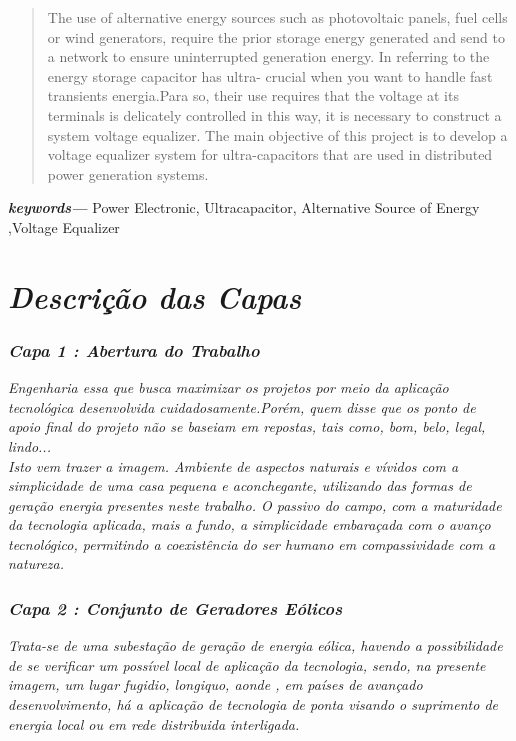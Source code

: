 \documentclass[11pt, a4paper, oneside]{article}
\providecommand{\keywords}[1]{\textbf{\textit{keywords---}} #1}
\begin{document}
\begin{abstract}
The use of alternative energy sources such as photovoltaic panels,
fuel cells or wind generators, require the prior storage
energy generated and send to a network to ensure uninterrupted generation
energy. In referring to the energy storage capacitor has ultra-
crucial when you want to handle fast transients
energia.Para so, their use requires that the voltage at its terminals is
delicately controlled in this way, it is necessary to construct a system
voltage equalizer. The main objective of this project is to develop
a voltage equalizer system for ultra-capacitors that are used in
distributed power generation systems.
\end{abstract}

\keywords{ Power Electronic, Ultracapacitor, Alternative Source of Energy ,Voltage Equalizer}


\newpage

\tableofcontents
\listoffigures

\newpage

\section{\textit{Descrição das Capas}}

\subsubsection{\textit{Capa 1 : Abertura do Trabalho}}
\textit{Engenharia essa que busca maximizar os projetos por meio da aplicação tecnológica desenvolvida cuidadosamente.Porém, quem disse que os ponto de apoio final
do projeto não se baseiam em repostas, tais como, bom, belo, legal, lindo...\\
Isto vem trazer a imagem. Ambiente de aspectos naturais e vívidos com a simplicidade de uma casa pequena e aconchegante, utilizando das formas de geração energia 
presentes neste trabalho. O passivo do campo, com a maturidade da tecnologia aplicada, mais a fundo, a simplicidade embaraçada com o avanço tecnológico, permitindo
a coexistência do ser humano em compassividade com a natureza.}

\subsubsection{\textit{Capa 2 : Conjunto de Geradores Eólicos}}
\textit{Trata-se de uma subestação de geração de energia eólica, havendo a possibilidade de se verificar um possível local de aplicação da tecnologia, sendo, na presente imagem,
um lugar fugidio, longiquo, aonde , em países de avançado desenvolvimento, há a aplicação de tecnologia de ponta visando o suprimento de energia local ou em rede distribuida interligada.} 
\end{document}
